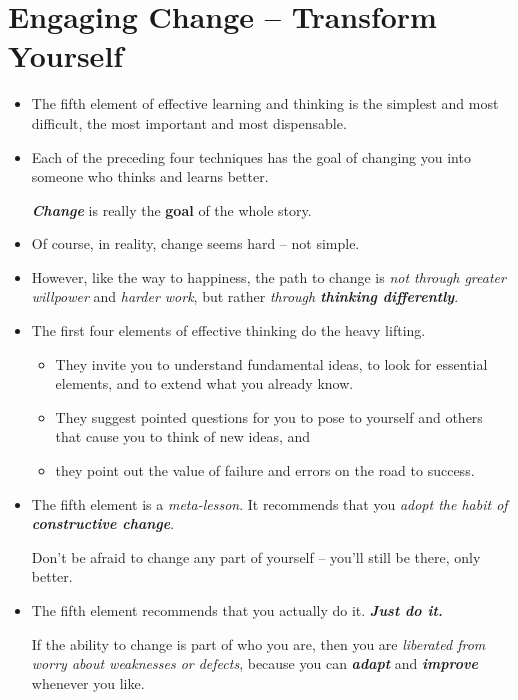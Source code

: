 \documentclass[11pt]{article}
\begin{document}
\section{Engaging Change -- Transform Yourself}
\begin{itemize}
\item The fifth element of effective learning and thinking is the simplest and most difficult, the most important and most dispensable. 

\item Each of the preceding four techniques has the goal of changing you into someone who thinks and learns better.

\emph{\textbf{Change}} is really the \textbf{goal} of the whole story.

\item Of course, in reality, change seems hard -- not simple. 

\item However, like the way to happiness, the path to change is \emph{not through greater willpower} and \emph{harder work}, but rather \emph{through \textbf{thinking differently}}.

\item The first four elements of effective thinking do the heavy lifting. 
\begin{itemize}
\item They invite you to understand fundamental ideas, to look for essential elements, and to extend what you already know. 
\item They suggest pointed questions for you to pose to yourself and others that cause you to think of new ideas, and 
\item they point out the value of failure and errors on the road to success.
\end{itemize}

\item The fifth element is a \emph{meta-lesson}. It recommends that you \emph{adopt the habit of \textbf{constructive change}}.

Don’t be afraid to change any part of yourself -- you’ll still be there, only better.

\item The fifth element recommends that you actually do it. \emph{\textbf{Just do it.}} 

If the ability to change is part of who you are, then you are \emph{liberated from worry about weaknesses or defects}, because you can \emph{\textbf{adapt}} and \emph{\textbf{improve}} whenever you like.


\end{itemize}
\end{document}
